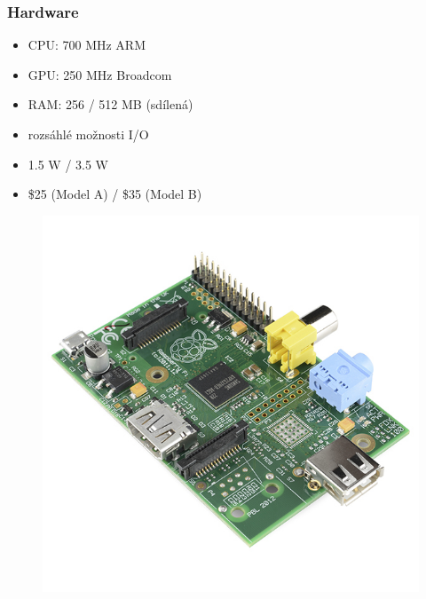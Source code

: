 \documentclass{beamer}
\begin{document}
\begin{frame}\frametitle{Hardware}
\begin{itemize}
\item CPU: 700 MHz ARM
\item GPU: 250 MHz Broadcom
\item RAM: 256 / 512 MB (sdílená)
\item rozsáhlé možnosti I/O
\item 1.5 W / 3.5 W
\item \$25 (Model A) / \$35 (Model B)
\end{itemize}
\begin{figure}[htp]
\centering
\includegraphics[scale=.3]{modA.jpg}
\end{figure}
\end{frame}
\end{document}
